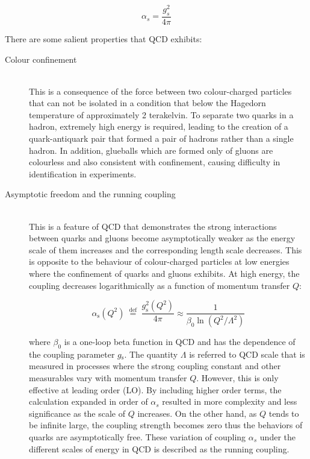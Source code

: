 \documentclass[UTF8,12pt]{ctexart}
\numberwithin{equation}{section}
\begin{document}
\begin{equation}
\alpha_{s}=\frac{g_{s}^{2}}{4 \pi}
\end{equation}


There are some salient properties that QCD exhibits:
\begin{description}
\item[Colour confinement] \mbox{} \\
	This is a consequence of the force between two colour-charged particles that can not be isolated in a condition that below the Hagedorn temperature of approximately 2 terakelvin. To separate two quarks in a hadron, extremely high energy is required, leading to the creation of a quark-antiquark pair that formed a pair of hadrons rather than a single hadron. In addition, glueballs which are formed only of gluons are colourless and also consistent with confinement, causing difficulty in identification in experiments. 
	
	
	

\item[Asymptotic freedom and the running coupling] \mbox{} \\
	This is a feature of QCD that demonstrates the strong interactions between quarks and gluons become asymptotically weaker as the energy scale of them increases and the corresponding length scale decreases. This is opposite to the behaviour of colour-charged particles at low energies where the confinement of quarks and gluons exhibits. At high energy, the coupling decreases logarithmically as a function of momentum transfer $Q$:

		\begin{equation}
		\alpha_{\mathrm{s}}\left(Q^{2}\right) \stackrel{\text { def }}{=} \frac{g_{\mathrm{s}}^{2}\left(Q^{2}\right)}{4 \pi} \approx \frac{1}{\beta_{0} \ln \left(Q^{2} / \Lambda^{2}\right)}
		\end{equation}
		
where $\beta_{0}$ is a one-loop beta function in QCD and has the dependence of the coupling parameter $g$$_\mathrm{s}$. The quantity $\Lambda$ is referred to QCD scale that is measured in processes where the strong coupling constant and other measurables vary with momentum transfer $Q$.
However, this is only effective at leading order (LO). By including higher order terms, the calculation expanded in order of $\alpha_{s}$ resulted in more complexity and less significance as the scale of $Q$ increases. On the other hand, as $Q$ tends to be infinite large, the coupling strength becomes zero thus the behaviors of quarks are asymptotically free. These variation of coupling $\alpha_{s}$ under the different scales of energy in QCD is described as the running coupling.



	
\end{description}
\end{document}
